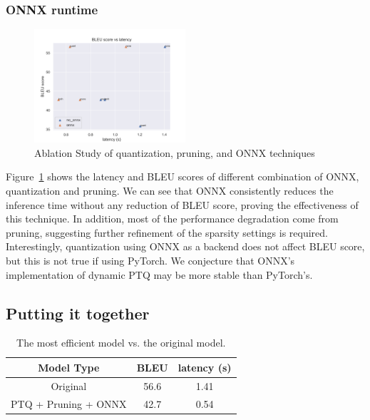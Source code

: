 \documentclass[11pt]{article}
\begin{document}
\subsubsection{ONNX runtime}


\begin{figure}[h!]
    \centering
    \includegraphics[width=0.5\textwidth]{images/ablation/BLEU_vs_latency.png}
    \caption{Ablation Study of quantization, pruning, and ONNX techniques}
    \label{fig:ablation}
\end{figure}

Figure~\ref{fig:ablation} shows the latency and BLEU scores of different combination of ONNX, quantization and pruning.
We can see that ONNX consistently reduces the inference time without any reduction of BLEU score, proving the effectiveness of this technique.
In addition, most of the performance degradation come from pruning, suggesting further refinement of the sparsity settings is required.
Interestingly, quantization using ONNX as a backend does not affect BLEU score, but this is not true if using PyTorch. We conjecture that ONNX's implementation of dynamic PTQ may be more stable than PyTorch's.



\subsection{Putting it together}


\begin{table}[h!]
\centering
\begin{tabular}{ccc}
Model Type             & BLEU & latency (s)  \\ \hline
Original               & 56.6  & 1.41        \\
PTQ + Pruning + ONNX   & 42.7  & 0.54        \\      
\end{tabular}
\caption{The most efficient model vs. the original model.}
\label{tab:final_product}
\end{table}
\end{document}
